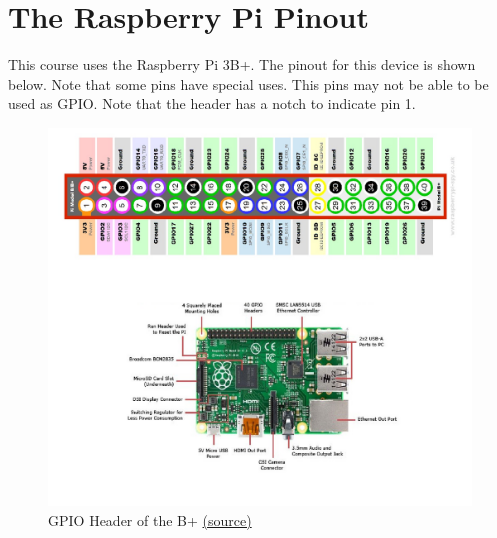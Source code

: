 \section{The Raspberry Pi Pinout}
This course uses the Raspberry Pi 3B+. The pinout for this device is shown below. Note that some pins have special uses. This pins may not be able to be used as GPIO. Note that the header has a notch to indicate pin 1.  

\begin{figure}[H]
\centering
\includegraphics[width=1\columnwidth]{Figures/pinout}
\caption{GPIO Header of the B+ \href{https://www.jameco.com/Jameco/workshop/circuitnotes/raspberry-pi-circuit-note.html}{(source)}}
\label{fig:pinout}
\end{figure}


